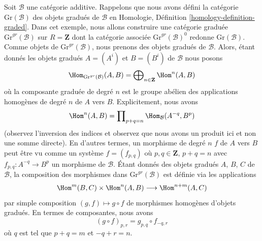 \begin{example}
\label{example-graded-category-graded-objects}
Soit $\mathcal{B}$ une catégorie additive. Rappelons que nous avons défini la
catégorie $\text{Gr}(\mathcal{B})$ des objets gradués de $\mathcal{B}$ en
Homologie, Définition \ref{homology-definition-graded}. Dans cet exemple, nous
allons construire une catégorie graduée $\text{Gr}^{gr}(\mathcal{B})$ sur $R =
\mathbf{Z}$ dont la catégorie associée $\text{Gr}^{gr}(\mathcal{B})^0$ redonne
$\text{Gr}(\mathcal{B})$. Comme objets de $\text{Gr}^{gr}(\mathcal{B})$, nous
prenons des objets gradués de $\mathcal{B}$. Alors, étant donnés les objets gradués
$A = (A^i)$ et $B = (B^i)$ de $\mathcal{B}$ nous posons
$$
\Hom_{\text{Gr}^{gr}(\mathcal{B})}(A, B) =
\bigoplus\nolimits_{n \in \mathbf{Z}} \Hom^n(A, B)
$$
où la composante graduée de degré $n$ est le groupe abélien des applications homogènes
de degré $n$ de $A$ vers $B$. Explicitement, nous avons
$$
\Hom^n(A, B) = \prod\nolimits_{p + q = n} \Hom_\mathcal{B}(A^{-q}, B^p)
$$
(observez l'inversion des indices et observez que nous avons un produit ici et non
une somme directe). En d'autres termes, un morphisme de degré $n$ $f$ de $A$ vers
$B$ peut être vu comme un système $f = (f_{p, q})$ où $p, q \in \mathbf{Z}$, $p +
q = n$ avec $f_{p, q} : A^{-q} \to B^p$ un morphisme de $\mathcal{B}$. Étant donnés
des objets gradués $A$, $B$, $C$ de $\mathcal{B}$, la composition des morphismes
dans $\text{Gr}^{gr}(\mathcal{B})$ est définie via les applications
$$
\Hom^m(B, C) \times \Hom^n(A, B) \longrightarrow \Hom^{n + m}(A, C)
$$
par simple composition $(g, f) \mapsto g \circ f$ de morphismes homogènes d'objets
gradués. En termes de composantes, nous avons
$$
(g \circ f)_{p, r} = g_{p, q} \circ f_{-q, r}
$$
où $q$ est tel que $p + q = m$ et $-q + r = n$.
\end{example}


